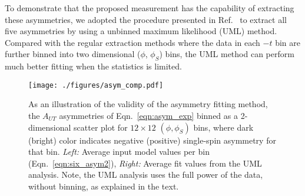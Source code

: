To demonstrate that the proposed measurement has the capability of extracting
these asymmetries, we adopted the procedure presented in
Ref.~\cite{hermes-thesis} to extract all five asymmetries by using a unbinned
maximum likelihood (UML) method. Compared with the regular extraction methods
where the data in each $-t$ bin are further binned into two dimensional
($\phi$, $\phi_S$) bins, the UML method can perform much better fitting when
the statistics is limited.

\begin{figure}[hbt!]
\begin{center}
\texttt{[image: ./figures/asym\_comp.pdf]}
\end{center}
\caption{\label{fig:asym_comp}
\footnotesize{As an illustration of the validity of the asymmetry fitting
  method, the $A_{UT}$ asymmetries of Eqn.~\ref{eqn:asym_exp} binned as a
  2-dimensional scatter plot for $12\times 12$ $(\phi,\phi_S)$ bins, where
  dark (bright) color indicates negative (positive) single-spin asymmetry for
  that bin.
   {\it Left:} Average input model values per bin (Eqn.~\ref{eqn:six_asym2}), 
   {\it Right:} Average fit values from the UML analysis.
Note, the UML analysis uses the full power of the data, without binning, as
explained in the text.}}
\end{figure}

